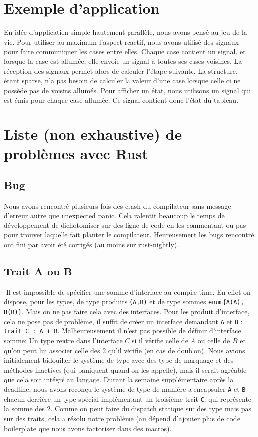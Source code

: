 \documentclass[a4paper]{article}
\renewcommand{\(}{\left(}
\renewcommand{\)}{\right)}
\begin{document}
\section{Exemple d'application}

En idée d'application simple hautement parallèle, nous avons pensé au jeu de la
vie. Pour utiliser au maximum l'aspect réactif, nous avons utilisé des signaux
pour faire communiquer les cases entre elles. Chaque case contient un signal, et
lorsque la case est allumée, elle envoie un signal à toutes ses cases voisines.
La réception des signaux permet alors de calculer l'étape suivante. La
structure, étant sparse, n'a pas besoin de calculer la valeur d'une case lorsque
celle ci ne possède pas de voisins allumés. Pour afficher un état, nous
utilisons un signal qui est émis pour chaque case allumée. Ce signal contient
donc l'état du tableau.


\section{Liste (non exhaustive) de problèmes avec Rust}
\subsection{Bug}
Nous avons rencontré plusieurs fois des crash du compilateur sans message d'erreur
autre que \og unexpected panic\fg{}. Cela ralentit beaucoup le temps de
développement de dichotomiser sur des ligne de code en les commentant ou pas
pour trouver laquelle fait planter le compilateur. Heureusement les bugs
rencontré ont fini par avoir été corrigés (au moins sur rust-nightly).


\subsection{Trait A ou B}
-Il est impossible de spécifier une somme d'interface au compile time. En effet
on dispose, pour les types, de type produits \verb!(A,B)! et de type sommes
\verb!enum{A(A), B(B)}!. Mais on ne pas faire cela avec des interfaces. Pour les
produit d'interface, cela ne pose pas de problème, il suffit de créer un
interface demandant \verb!A! et \verb!B! : \verb!trait C : A + B!.
Malheureusement il n'est pas possible de définir d'interface somme: Un type
rentre dans l'interface $C$ si il vérifie celle de $A$ ou celle de $B$ et qu'on
peut lui associer celle des 2 qu'il vérifie (en cas de doublon). Nous avions initialement
bidouiller le système de type avec des type de marquage et des méthodes
inactives (qui paniquent quand on les appelle), mais il serait agréable
que cela soit intégré au langage. Durant la semaine supplémentaire après la
deadline, nous avons reconçu le système de type de manière a encapsuler \verb!A!
et \verb!B! chacun derrière un type spécial implémentant un troisième trait
\verb!C!. qui représente la somme des 2. Comme on peut faire du dispatch
statique sur des type mais pas sur des traits, cela a résolu notre problème (au
dépend d'ajouter plus de code boilerplate que nous avons factoriser dans des macros).
\end{document}
